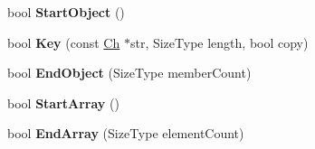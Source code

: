 \begin{DoxyCompactItemize}
\item 
bool {\bfseries Start\+Object} ()\hypertarget{class_generic_document_abb1417fde52cc34cb340e3b50a3295da}{}\label{class_generic_document_abb1417fde52cc34cb340e3b50a3295da}

\item 
bool {\bfseries Key} (const \hyperlink{class_generic_value_ade0e0ce64ccd5d852da57a35e720bafb}{Ch} $\ast$str, Size\+Type length, bool copy)\hypertarget{class_generic_document_a600d0950baabbcab11197cacb1459c7a}{}\label{class_generic_document_a600d0950baabbcab11197cacb1459c7a}

\item 
bool {\bfseries End\+Object} (Size\+Type member\+Count)\hypertarget{class_generic_document_a42f2df68f9c9d8b88a15b609716867d9}{}\label{class_generic_document_a42f2df68f9c9d8b88a15b609716867d9}

\item 
bool {\bfseries Start\+Array} ()\hypertarget{class_generic_document_ae12c513c61745ae731a47b1ca33db063}{}\label{class_generic_document_ae12c513c61745ae731a47b1ca33db063}

\item 
bool {\bfseries End\+Array} (Size\+Type element\+Count)\hypertarget{class_generic_document_a14097c833bed1a9c7be064ea619c887f}{}\label{class_generic_document_a14097c833bed1a9c7be064ea619c887f}

\end{DoxyCompactItemize}
